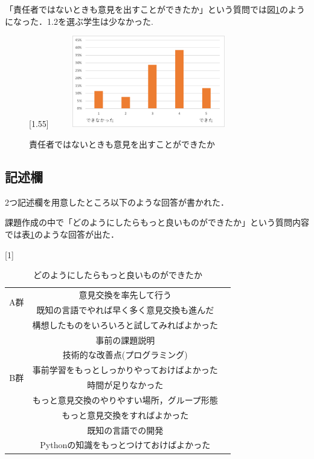 \documentclass[a4j,11pt]{jsarticle}
\begin{document}
「責任者ではないときも意見を出すことができたか」という質問では図\ref{anke17}のようになった．1.2を選ぶ学生は少なかった.

\begin{figure}[h]
\begin{center}
\scalebox{1.2}[1.55]{
 \includegraphics[clip,width=85mm,height=40mm]{anke17.pdf}
 }
\end{center}
 \caption{責任者ではないときも意見を出すことができたか}
 \label{anke17}
\end{figure}


\newpage
\subsection{記述欄}
2つ記述欄を用意したところ以下のような回答が書かれた．

課題作成の中で「どのようにしたらもっと良いものができたか」という質問内容では表\ref{anke18}のような回答が出た．

\begin{table}[htbp]
\begin{center}
\caption{どのようにしたらもっと良いものができたか}
\scalebox{1}[1]{
\begin{tabular}{|c|c|c|}
\cline{1-2}
\multicolumn{1}{|c|}{\multirow{2}{*}{A群}} & 意見交換を率先して行う   \\ \cline{2-2}  
\multicolumn{1}{|c|}{} &  既知の言語でやれば早く多く意見交換も進んだ \\ \cline{2-2}  
\multicolumn{1}{|c|}{} &  構想したものをいろいろと試してみればよかった \\ \cline{2-2}  
\multicolumn{1}{|c|}{} &  事前の課題説明 \\ \cline{2-2} 
\multicolumn{1}{|c|}{} &  技術的な改善点(プログラミング) \\ \cline{1-2} 
 \multicolumn{1}{|c|}{\multirow{2}{*}{B群}} & 事前学習をもっとしっかりやっておけばよかった  \\ \cline{2-2}  
\multicolumn{1}{|c|}{} & 時間が足りなかった  \\ \cline{2-2}  
\multicolumn{1}{|c|}{} & もっと意見交換のやりやすい場所，グループ形態 \\ \cline{2-2}  
\multicolumn{1}{|c|}{} & もっと意見交換をすればよかった  \\ \cline{2-2}  
\multicolumn{1}{|c|}{} & 既知の言語での開発  \\ \cline{2-2}  
\multicolumn{1}{|c|}{} & Pythonの知識をもっとつけておけばよかった  \\ \cline{1-2}  
\end{tabular}
}
\label{anke18}
\end{center}
\end{table}
\end{document}
